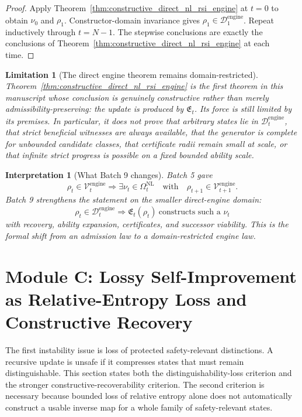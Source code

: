 \documentclass[11pt]{article}
\newtheorem{interpretation}[theorem]{Interpretation}
\newtheorem{limitation}[theorem]{Limitation}
\newcommand{\1}{\mathbf{1}}
\providecommand{\Dcal}{\mathcal{D}}
\providecommand{\Vcal}{\mathcal{V}}
\begin{document}
\begin{proof}
Apply Theorem~\ref{thm:constructive_direct_nl_rsi_engine} at \(t=0\) to obtain \(\nu_0\) and \(\rho_1\).  Constructor-domain invariance gives \(\rho_1\in\Dcal_1^{\mathrm{engine}}\).  Repeat inductively through \(t=N-1\).  The stepwise conclusions are exactly the conclusions of Theorem~\ref{thm:constructive_direct_nl_rsi_engine} at each time.
\end{proof}

\begin{limitation}[The direct engine theorem remains domain-restricted]
Theorem~\ref{thm:constructive_direct_nl_rsi_engine} is the first theorem in this manuscript whose conclusion is genuinely constructive rather than merely admissibility-preserving: the update is produced by \(\mathfrak E_t\).  Its force is still limited by its premises.  In particular, it does not prove that arbitrary states lie in \(\Dcal_t^{\mathrm{engine}}\), that strict beneficial witnesses are always available, that the generator is complete for unbounded candidate classes, that certificate radii remain small at scale, or that infinite strict progress is possible on a fixed bounded ability scale.
\end{limitation}

\begin{interpretation}[What Batch 9 changes]
Batch 5 gave
\[
\rho_t\in\Vcal_t^{\mathrm{engine}}
\Longrightarrow
\exists\nu_t\in\Omega_t^{\mathrm{NL}}
\quad\text{with}\quad
\rho_{t+1}\in\Vcal_{t+1}^{\mathrm{engine}}.
\]
Batch 9 strengthens the statement on the smaller direct-engine domain:
\[
\rho_t\in\Dcal_t^{\mathrm{engine}}
\Longrightarrow
\mathfrak E_t(\rho_t)\ \text{constructs such a }\nu_t
\]
with recovery, ability expansion, certificates, and successor viability.  This is the formal shift from an admission law to a domain-restricted engine law.
\end{interpretation}


\section{Module C: Lossy Self-Improvement as Relative-Entropy Loss and Constructive Recovery}
\label{sec:relative_entropy_loss}

The first instability issue is loss of protected safety-relevant distinctions.  A recursive update is unsafe if it compresses states that must remain distinguishable.  This section states both the distinguishability-loss criterion and the stronger constructive-recoverability criterion.  The second criterion is necessary because bounded loss of relative entropy alone does not automatically construct a usable inverse map for a whole family of safety-relevant states.
\end{document}
